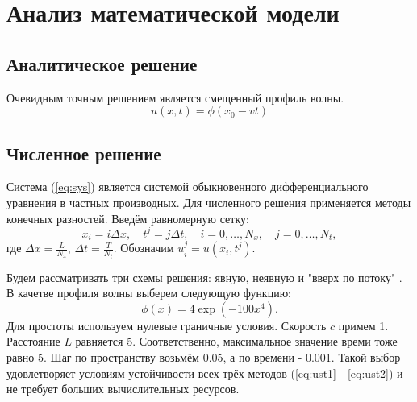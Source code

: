\chapter{Анализ математической модели}
\section{Аналитическое решение}
Очевидным точным решением является смещенный профиль волны.
\[
	u(x,t) = \phi(x_{0} - vt)
\]

\section{Численное решение}
Система (\ref{eq:sys}) является системой обыкновенного дифференциального уравнения в частных производных.
Для численного решения применяется методы конечных разностей\cite{Turchak2003}. Введём равномерную сетку:
\[
x_i = i \Delta x, \quad t^j = j \Delta t, \quad i = 0, \dots, N_x, \quad j = 0, \dots, N_t,
\]
где $\Delta x = \frac{L}{N_x}$, $\Delta t = \frac{T}{N_t}$. Обозначим $u_i^j = u(x_i, t^j)$.

Будем рассматривать три схемы решения: явную\cite{Turchak2003}, неявную\cite{Turchak2003} и "вверх по потоку" \cite{Patankar1984}.
В качетве профиля волны выберем следующую функцию:
\[
	\phi(x) = 4\exp(-100 x^4).
\]
Для простоты используем нулевые граничные условия. 
Скорость $c$ примем 1. Расстояние $L$ равняется 5. Соответственно, максимальное значение времи тоже равно 5.
Шаг по пространству возьмём 0.05, а по времени - 0.001. Такой выбор удовлетворяет условиям устойчивости всех трёх методов (\ref{eq:ust1} - \ref{eq:ust2}) и не требует больших вычислительных ресурсов.





